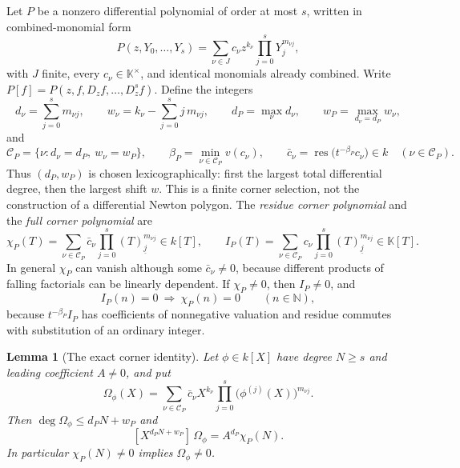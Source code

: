 \documentclass[11pt]{article}
\numberwithin{equation}{section}
\newtheorem{lemma}[theorem]{Lemma}
\theoremstyle{definition}
\theoremstyle{remark}
\newcommand{\N}{\mathbb N}
\newcommand{\res}{\operatorname{res}}
\newcommand{\fall}[2]{(#1)_{\underline{#2}}}
\newcommand{\KK}{\mathbb K}
\begin{document}
Let $P$ be a nonzero differential polynomial of order at most $s$, written in
combined-monomial form
\begin{equation}\label{hol:nl:eq:P}
 P(z,Y_0,\ldots,Y_s)=\sum_{\nu\in J}c_\nu z^{k_\nu}\prod_{j=0}^sY_j^{m_{\nu j}},
\end{equation}
with $J$ finite, every $c_\nu\in\KK^\times$, and identical monomials already
combined. Write $P[f]=P(z,f,D_zf,\ldots,D_z^sf)$. Define the integers
\begin{equation}\label{hol:nl:eq:dw}
 d_\nu=\sum_{j=0}^sm_{\nu j},\qquad
 w_\nu=k_\nu-\sum_{j=0}^sj\,m_{\nu j},\qquad
 d_P=\max_\nu d_\nu,\qquad
 w_P=\max_{d_\nu=d_P}w_\nu,
\end{equation}
and
\[
 \mathcal C_P=\{\nu:d_\nu=d_P,\ w_\nu=w_P\},\qquad
 \beta_P=\min_{\nu\in\mathcal C_P}v(c_\nu),\qquad
 \bar c_\nu=\res\bigl(t^{-\beta_P}c_\nu\bigr)\in k\quad(\nu\in\mathcal C_P).
\]
Thus $(d_P,w_P)$ is chosen lexicographically: first the largest total
differential degree, then the largest shift $w$. This is a finite corner
selection, not the construction of a differential Newton polygon. The
\emph{residue corner polynomial} and the \emph{full corner polynomial} are
\begin{equation}\label{hol:nl:eq:chiI}
 \chi_P(T)=\sum_{\nu\in\mathcal C_P}\bar c_\nu
 \prod_{j=0}^s\fall Tj^{m_{\nu j}}\in k[T],\qquad
 I_P(T)=\sum_{\nu\in\mathcal C_P}c_\nu
 \prod_{j=0}^s\fall Tj^{m_{\nu j}}\in\KK[T].
\end{equation}
In general $\chi_P$ can vanish although some $\bar c_\nu\ne0$, because
different products of falling factorials can be linearly dependent. If
$\chi_P\ne0$, then $I_P\ne0$, and
\begin{equation}\label{hol:nl:eq:rootcontainment}
 I_P(n)=0\ \Longrightarrow\ \chi_P(n)=0\qquad(n\in\N),
\end{equation}
because $t^{-\beta_P}I_P$ has coefficients of nonnegative valuation and residue
commutes with substitution of an ordinary integer.

\begin{lemma}[The exact corner identity]\label{hol:nl:lem:corner}
Let $\phi\in k[X]$ have degree $N\ge s$ and leading coefficient $A\ne0$, and
put
\[
 \Omega_\phi(X)=\sum_{\nu\in\mathcal C_P}\bar c_\nu X^{k_\nu}
 \prod_{j=0}^s\bigl(\phi^{(j)}(X)\bigr)^{m_{\nu j}}.
\]
Then $\deg\Omega_\phi\le d_PN+w_P$ and
\begin{equation}\label{hol:nl:eq:corneridentity}
 [X^{d_PN+w_P}]\,\Omega_\phi=A^{d_P}\chi_P(N).
\end{equation}
In particular $\chi_P(N)\ne0$ implies $\Omega_\phi\ne0$.
\end{lemma}
\end{document}
